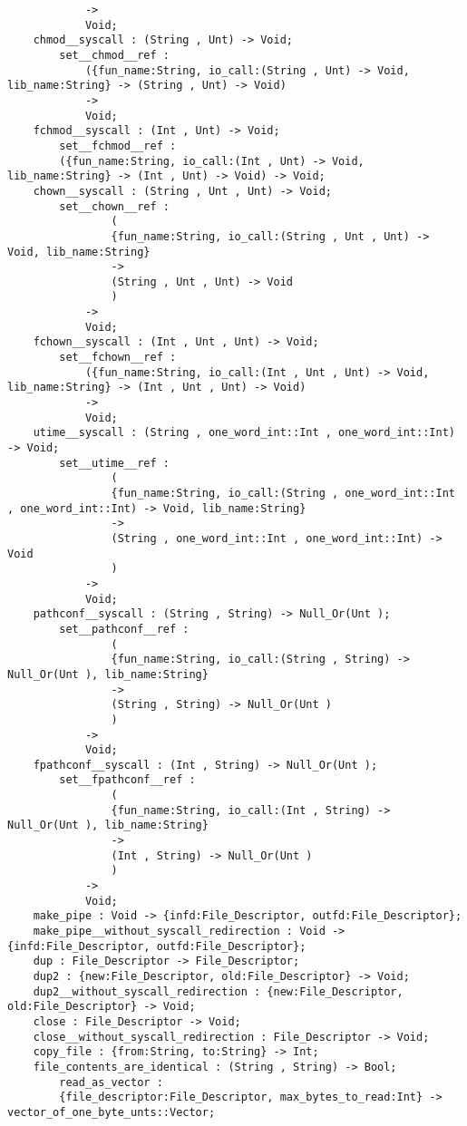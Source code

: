 \begin{verbatim}
            ->
            Void;
    chmod__syscall : (String , Unt) -> Void;
        set__chmod__ref :
            ({fun_name:String, io_call:(String , Unt) -> Void, lib_name:String} -> (String , Unt) -> Void)
            ->
            Void;
    fchmod__syscall : (Int , Unt) -> Void;
        set__fchmod__ref :
        ({fun_name:String, io_call:(Int , Unt) -> Void, lib_name:String} -> (Int , Unt) -> Void) -> Void;
    chown__syscall : (String , Unt , Unt) -> Void;
        set__chown__ref :
                (
                {fun_name:String, io_call:(String , Unt , Unt) -> Void, lib_name:String}
                ->
                (String , Unt , Unt) -> Void
                )
            ->
            Void;
    fchown__syscall : (Int , Unt , Unt) -> Void;
        set__fchown__ref :
            ({fun_name:String, io_call:(Int , Unt , Unt) -> Void, lib_name:String} -> (Int , Unt , Unt) -> Void)
            ->
            Void;
    utime__syscall : (String , one_word_int::Int , one_word_int::Int) -> Void;
        set__utime__ref :
                (
                {fun_name:String, io_call:(String , one_word_int::Int , one_word_int::Int) -> Void, lib_name:String}
                ->
                (String , one_word_int::Int , one_word_int::Int) -> Void
                )
            ->
            Void;
    pathconf__syscall : (String , String) -> Null_Or(Unt );
        set__pathconf__ref :
                (
                {fun_name:String, io_call:(String , String) -> Null_Or(Unt ), lib_name:String}
                ->
                (String , String) -> Null_Or(Unt )
                )
            ->
            Void;
    fpathconf__syscall : (Int , String) -> Null_Or(Unt );
        set__fpathconf__ref :
                (
                {fun_name:String, io_call:(Int , String) -> Null_Or(Unt ), lib_name:String}
                ->
                (Int , String) -> Null_Or(Unt )
                )
            ->
            Void;
    make_pipe : Void -> {infd:File_Descriptor, outfd:File_Descriptor};
    make_pipe__without_syscall_redirection : Void -> {infd:File_Descriptor, outfd:File_Descriptor};
    dup : File_Descriptor -> File_Descriptor;
    dup2 : {new:File_Descriptor, old:File_Descriptor} -> Void;
    dup2__without_syscall_redirection : {new:File_Descriptor, old:File_Descriptor} -> Void;
    close : File_Descriptor -> Void;
    close__without_syscall_redirection : File_Descriptor -> Void;
    copy_file : {from:String, to:String} -> Int;
    file_contents_are_identical : (String , String) -> Bool;
        read_as_vector :
        {file_descriptor:File_Descriptor, max_bytes_to_read:Int} -> vector_of_one_byte_unts::Vector;

\end{verbatim}
